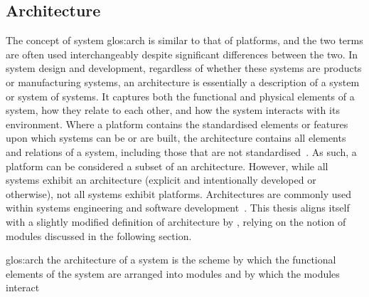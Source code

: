 \subsection{Architecture}
The concept of system \gls{glos:arch} is similar to that of platforms, and the two terms are often used interchangeably despite significant differences between the two.
In system design and development, regardless of whether these systems are products or manufacturing systems, an architecture is essentially a description of a system or system of systems.
It captures both the functional and physical elements of a system, how they relate to each other, and how the system interacts with its environment.
Where a platform contains the standardised elements or features upon which systems can be or are built, the architecture contains all elements and relations of a system, including those that are not standardised~\parencite{HarlouU}.
As such, a platform can be considered a subset of an architecture.
However, while all systems exhibit an architecture (explicit and intentionally developed or otherwise), not all systems exhibit platforms.
Architectures are commonly used within systems engineering and software development~\parencite{9781118999400,ISO42010}.
This thesis aligns itself with a slightly modified definition of architecture by \textcite{UlrichEppinger}, relying on the notion of modules discussed in the following section.
\begin{definition}{\gls{glos:arch}}
the architecture of a system is the scheme by which the functional elements of the system are arranged into modules and by which the modules interact
\end{definition}


